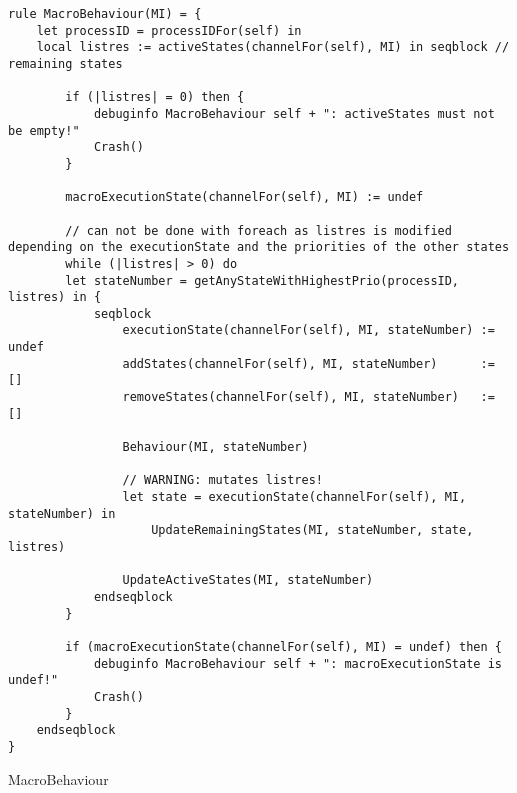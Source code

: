 \begin{listing}[H]
\begin{verbatim}
rule MacroBehaviour(MI) = {
    let processID = processIDFor(self) in
    local listres := activeStates(channelFor(self), MI) in seqblock // remaining states

        if (|listres| = 0) then {
            debuginfo MacroBehaviour self + ": activeStates must not be empty!"
            Crash()
        }

        macroExecutionState(channelFor(self), MI) := undef

        // can not be done with foreach as listres is modified depending on the executionState and the priorities of the other states
        while (|listres| > 0) do
        let stateNumber = getAnyStateWithHighestPrio(processID, listres) in {
            seqblock
                executionState(channelFor(self), MI, stateNumber) := undef
                addStates(channelFor(self), MI, stateNumber)      := []
                removeStates(channelFor(self), MI, stateNumber)   := []

                Behaviour(MI, stateNumber)

                // WARNING: mutates listres!
                let state = executionState(channelFor(self), MI, stateNumber) in
                    UpdateRemainingStates(MI, stateNumber, state, listres)

                UpdateActiveStates(MI, stateNumber)
            endseqblock
        }

        if (macroExecutionState(channelFor(self), MI) = undef) then {
            debuginfo MacroBehaviour self + ": macroExecutionState is undef!"
            Crash()
        }
    endseqblock
}
\end{verbatim}
\caption{MacroBehaviour}
\label{lst:asm:MacroBehaviour}
\end{listing}




